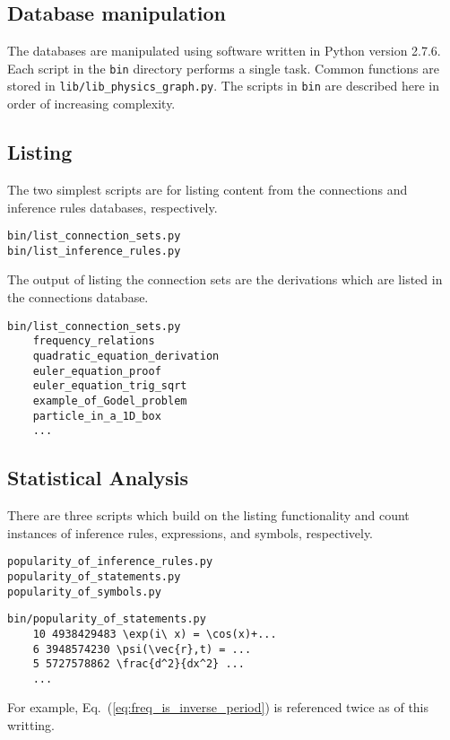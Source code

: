 \documentclass{article}
\newcommand{\eqn}[1]{Eq.\ (\ref{#1})}
\begin{document}
\begin{multicols}{2}
\section{Database manipulation}

The databases are manipulated using software written in Python\cite{2015_Python} version 2.7.6. 
Each script in the \texttt{bin} directory performs a single task. 
Common functions are stored in \texttt{lib/lib\_physics\_graph.py}. 
The scripts in \texttt{bin} are described here in order of increasing complexity. 

\subsection{Listing}

The two simplest scripts are for listing content from the connections and inference rules databases, respectively. 
\begin{verbatim}
bin/list_connection_sets.py
bin/list_inference_rules.py
\end{verbatim}

The output of listing the connection sets are the derivations which are listed in the connections database.
\begin{verbatim}
bin/list_connection_sets.py
    frequency_relations
    quadratic_equation_derivation
    euler_equation_proof
    euler_equation_trig_sqrt
    example_of_Godel_problem
    particle_in_a_1D_box
    ...
\end{verbatim}



\subsection{Statistical Analysis}
There are three scripts which build on the listing functionality and count instances of inference rules, expressions, and symbols, respectively. 
\begin{verbatim}
popularity_of_inference_rules.py
popularity_of_statements.py
popularity_of_symbols.py
\end{verbatim}

\begin{verbatim}
bin/popularity_of_statements.py
    10 4938429483 \exp(i\ x) = \cos(x)+...
    6 3948574230 \psi(\vec{r},t) = ...
    5 5727578862 \frac{d^2}{dx^2} ...
    ...
\end{verbatim}
For example, \eqn{eq:freq_is_inverse_period} is referenced twice as of this writting. 


\end{multicols}
\end{document}
